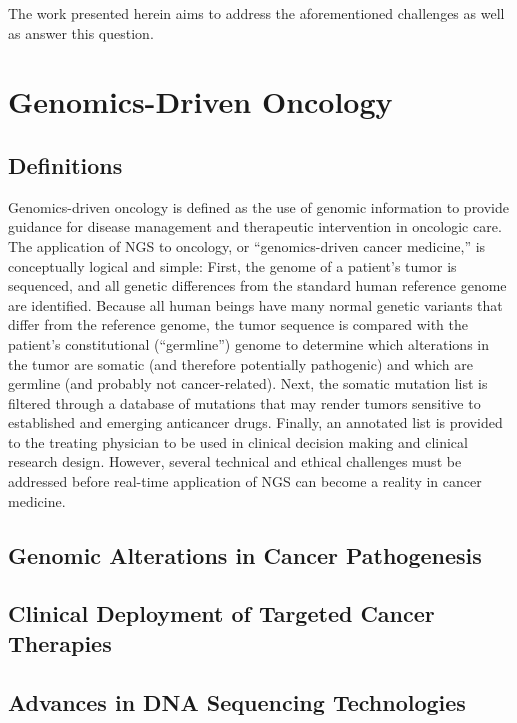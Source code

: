 The work presented herein aims to address the aforementioned challenges as well as answer this question.

\section{Genomics-Driven Oncology}
\label{sec:Genomics-DrivenOncology}

\subsection{Definitions}
Genomics-driven oncology is defined as the use of genomic information to provide guidance for disease management and therapeutic intervention in oncologic care. The application of NGS to oncology, or “genomics-driven cancer medicine,” is conceptually logical and simple: First, the genome of a patient’s tumor is sequenced, and all genetic differences from the standard human reference genome are identified. Because all human beings have many normal genetic variants that differ from the reference genome, the tumor sequence is compared with the patient’s constitutional (“germline”) genome to determine which alterations in the tumor are somatic (and therefore potentially pathogenic) and which are germline (and probably not cancer-related). Next, the somatic mutation list is filtered through a database of mutations that may render tumors sensitive to established and emerging anticancer drugs. Finally, an annotated list is provided to the treating physician to be used in clinical decision making and clinical research design. However, several technical and ethical challenges must be addressed before real-time application of NGS can become a reality in cancer medicine.

\subsection{Genomic Alterations in Cancer Pathogenesis}

\subsection{Clinical Deployment of Targeted Cancer Therapies}

\subsection{Advances in DNA Sequencing Technologies}

